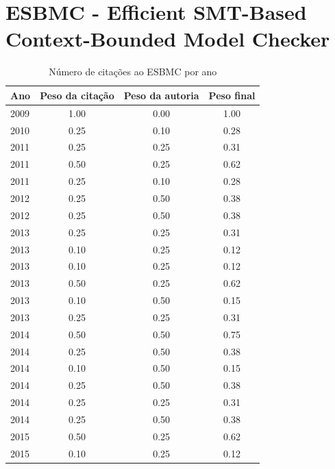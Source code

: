 \section{ESBMC - Efficient SMT-Based Context-Bounded Model Checker}
\begin{table}[H]
\caption{Número de citações ao ESBMC  por ano}
\centering
\begin{tabular}{| l | c | c | c |}
  \hline
  Ano & Peso da citação & Peso da autoria & Peso final \\
  \hline
  2009
    & 1.00
    & 0.00
    & {\color{blue} 1.00} \\
\hline
  2010
    & 0.25
    & 0.10
    & {\color{red} 0.28} \\
\hline
  2011
    & 0.25
    & 0.25
    & {\color{red} 0.31} \\
  2011
    & 0.50
    & 0.25
    & {\color{blue} 0.62} \\
  2011
    & 0.25
    & 0.10
    & {\color{red} 0.28} \\
\hline
  2012
    & 0.25
    & 0.50
    & {\color{red} 0.38} \\
  2012
    & 0.25
    & 0.50
    & {\color{red} 0.38} \\
\hline
  2013
    & 0.25
    & 0.25
    & {\color{red} 0.31} \\
  2013
    & 0.10
    & 0.25
    & {\color{red} 0.12} \\
  2013
    & 0.10
    & 0.25
    & {\color{red} 0.12} \\
  2013
    & 0.50
    & 0.25
    & {\color{blue} 0.62} \\
  2013
    & 0.10
    & 0.50
    & {\color{red} 0.15} \\
  2013
    & 0.25
    & 0.25
    & {\color{red} 0.31} \\
\hline
  2014
    & 0.50
    & 0.50
    & {\color{blue} 0.75} \\
  2014
    & 0.25
    & 0.50
    & {\color{red} 0.38} \\
  2014
    & 0.10
    & 0.50
    & {\color{red} 0.15} \\
  2014
    & 0.25
    & 0.50
    & {\color{red} 0.38} \\
  2014
    & 0.25
    & 0.25
    & {\color{red} 0.31} \\
  2014
    & 0.25
    & 0.50
    & {\color{red} 0.38} \\
\hline
  2015
    & 0.50
    & 0.25
    & {\color{blue} 0.62} \\
  2015
    & 0.10
    & 0.25
    & {\color{red} 0.12} \\

\end{tabular}
\end{table}
